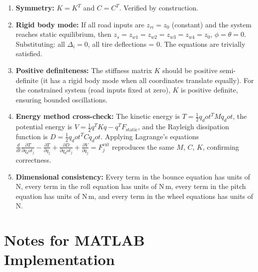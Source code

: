 \documentclass[11pt]{article}
\def\vect#1{#1}%
\def\dot#1{#1_dot}%
\newcommand{\vect}[1]{\bm{#1}}
\begin{document}
\begin{enumerate}
  \item \textbf{Symmetry:} $\vect{K} = \vect{K}^T$ and $\vect{C} = \vect{C}^T$. Verified by construction.

  \item \textbf{Rigid body mode:} If all road inputs are $z_{ri} = z_0$ (constant) and the system reaches static equilibrium, then $z_s = z_{w1} = z_{w2} = z_{w3} = z_{w4} = z_0$, $\phi = \theta = 0$. Substituting: all $\Delta_i = 0$, all tire deflections = 0. The equations are trivially satisfied.

  \item \textbf{Positive definiteness:} The stiffness matrix $\vect{K}$ should be positive semi-definite (it has a rigid body mode when all coordinates translate equally). For the constrained system (road inputs fixed at zero), $\vect{K}$ is positive definite, ensuring bounded oscillations.

  \item \textbf{Energy method cross-check:} The kinetic energy is $T = \frac{1}{2}\dot{\vect{q}}^T\vect{M}\dot{\vect{q}}$, the potential energy is $V = \frac{1}{2}\vect{q}^T\vect{K}\vect{q} - \vect{q}^T\vect{F}_{\text{static}}$, and the Rayleigh dissipation function is $D = \frac{1}{2}\dot{\vect{q}}^T\vect{C}\dot{\vect{q}}$. Applying Lagrange's equations $\frac{d}{dt}\frac{\partial T}{\partial \dot{q}_j} - \frac{\partial T}{\partial q_j} + \frac{\partial D}{\partial \dot{q}_j} + \frac{\partial V}{\partial q_j} = F_j^{\text{ext}}$ reproduces the same $\vect{M}$, $\vect{C}$, $\vect{K}$, confirming correctness.

  \item \textbf{Dimensional consistency:} Every term in the bounce equation has units of N, every term in the roll equation has units of N\,m, every term in the pitch equation has units of N\,m, and every term in the wheel equations has units of N.
\end{enumerate}

\section{Notes for MATLAB Implementation}
\end{document}
